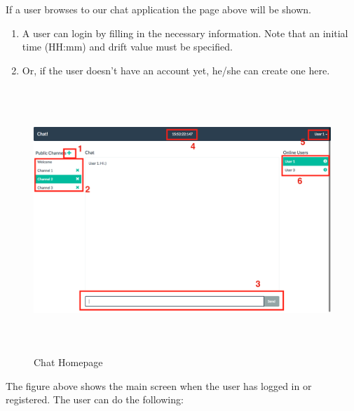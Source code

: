 \documentclass[11pt]{article}
\begin{document}
If a user browses to our chat application the page above will be shown.

\begin{enumerate}
	\item A user can login by filling in the necessary information. Note that an initial time (HH:mm) and drift value must be specified.
	\item Or, if the user doesn't have an account yet, he/she can create one here.
\end{enumerate}

\begin{figure}[H]
\centering
\includegraphics[height=100mm]{chat.png}
\caption{Chat Homepage}
\end{figure}

The figure above shows the main screen when the user has logged in or registered. The user can do the following:
\end{document}

